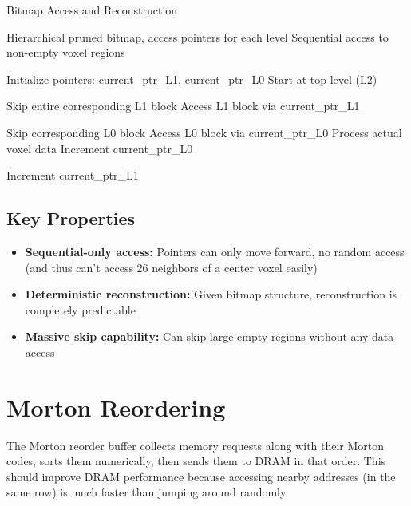 \documentclass[12pt]{article}
\begin{document}
\begin{algorithm}
\caption{Bitmap Access and Reconstruction}
\begin{algorithmic}
\REQUIRE Hierarchical pruned bitmap, access pointers for each level
\ENSURE Sequential access to non-empty voxel regions

\STATE Initialize pointers: current\_ptr\_L1, current\_ptr\_L0
\STATE Start at top level (L2)

        \STATE Skip entire corresponding L1 block
    \ELSE
        \STATE Access L1 block via current\_ptr\_L1
        
                \STATE Skip corresponding L0 block
            \ELSE
                \STATE Access L0 block via current\_ptr\_L0
                \STATE Process actual voxel data
                \STATE Increment current\_ptr\_L0
            \ENDIF
        \ENDFOR
        
        \STATE Increment current\_ptr\_L1
    \ENDIF
\ENDFOR
\end{algorithmic}
\end{algorithm}

\subsection{Key Properties}
\begin{itemize}
    \item \textbf{Sequential-only access:} Pointers can only move forward, no random access (and thus can't access 26 neighbors of a center voxel easily)
    \item \textbf{Deterministic reconstruction:} Given bitmap structure, reconstruction is completely predictable
    \item \textbf{Massive skip capability:} Can skip large empty regions without any data access
\end{itemize}

\section{Morton Reordering}

The Morton reorder buffer collects memory requests along with their Morton codes, sorts them numerically, then sends them to DRAM in that order. This should improve DRAM performance because accessing nearby addresses (in the same row) is much faster than jumping around randomly.
\end{document}
